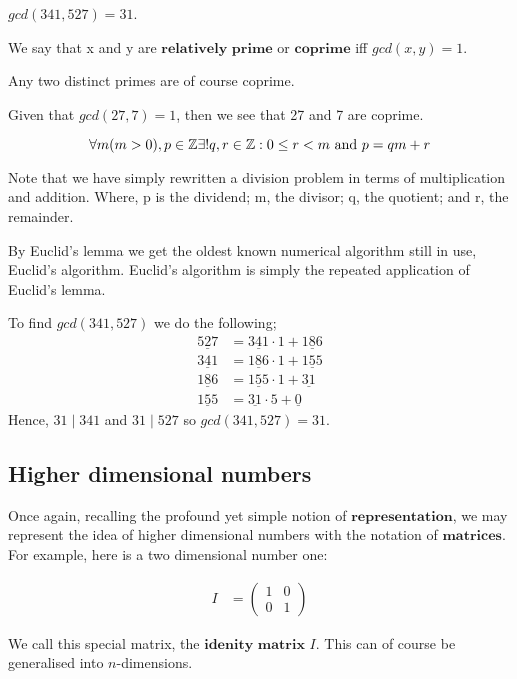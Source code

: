 \begin{exmp}
 $gcd(341,527) = 31$.
\end{exmp}

\begin{defn}
 We say that x and y are $\textbf{relatively prime}$ or $\textbf{coprime}$ iff
 $gcd(x,y) = 1$.
\end{defn}

\begin{note}
 Any two distinct primes are of course coprime.
\end{note}

\begin{exmp}
 Given that $gcd(27,7) = 1$, then we see that 27 and 7 are coprime.
\end{exmp}

\begin{lem}
	\[
		\forall m (m > 0), p \in \mathbb{Z} \exists ! q, r \in \mathbb{Z} : 0 \leq r < m \text{ and } p = qm + r
	\]
\end{lem}
Note that we have simply rewritten a division problem in terms of multiplication and addition.
Where, p is the dividend; m, the divisor; q, the quotient; and r, the remainder.

By Euclid's lemma we get the oldest known numerical algorithm still in use, Euclid's algorithm.
Euclid's algorithm is simply the repeated application of Euclid's lemma.

\begin{exmp}
 To find $gcd(341,527)$ we do the following;
 \begin{align*}
  \underline{527} &= \underline{341} \cdot 1 + \underline{186}
  \\
  \underline{341} &= \underline{186} \cdot 1 + \underline{155}
  \\
  \underline{186} &= \underline{155} \cdot 1 + \underline{31}
  \\
  \underline{155} &= \underline{31} \cdot 5 + \underline{0}
 \end{align*}
 Hence, $31 \mid 341$ and $31 \mid 527$ so $gcd(341,527) = 31$.
\end{exmp}

\subsection{Higher dimensional numbers} %
\label{subsec:higherdimnumbers}
Once again, recalling the profound yet simple notion of $\textbf{representation}$, we may represent the idea
of higher dimensional numbers with the notation of $\textbf{matrices}$. For example, here is a two dimensional
number one:
\begin{exmp}
 \begin{align*}
  I &=
  \begin{pmatrix}
   1 & 0 \\
   0 & 1
  \end{pmatrix}
 \end{align*}
\end{exmp}
We call this special matrix, the $\textbf{idenity matrix}$ $I$. This can of course be generalised into $n$-dimensions.

